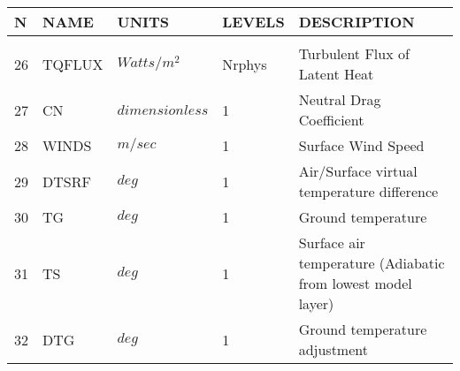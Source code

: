 \newpage
\vspace*{\fill}
\begin{tabular}{lllll}
\hline\hline
N & NAME & UNITS & LEVELS & DESCRIPTION \\
\hline

&\\
26 & TQFLUX   &  $Watts/m^2$ &  Nrphys
         &\begin{minipage}[t]{3in}
          {Turbulent Flux of Latent Heat}
         \end{minipage}\\
27 & CN       &  $dimensionless$ &  1
         &\begin{minipage}[t]{3in}
          {Neutral Drag Coefficient}
         \end{minipage}\\
28 & WINDS     &  $m/sec$ &  1
         &\begin{minipage}[t]{3in}
          {Surface Wind Speed}
         \end{minipage}\\
29 & DTSRF     &  $deg$ &  1
         &\begin{minipage}[t]{3in}
          {Air/Surface virtual temperature difference}
         \end{minipage}\\
30 & TG        &  $deg$ &  1
         &\begin{minipage}[t]{3in}
          {Ground temperature}
         \end{minipage}\\
31 & TS        &  $deg$ &  1
         &\begin{minipage}[t]{3in}
          {Surface air temperature (Adiabatic from lowest model layer)}
         \end{minipage}\\
32 & DTG       &  $deg$ &  1
         &\begin{minipage}[t]{3in}
          {Ground temperature adjustment}
         \end{minipage}\\


\end{tabular}
